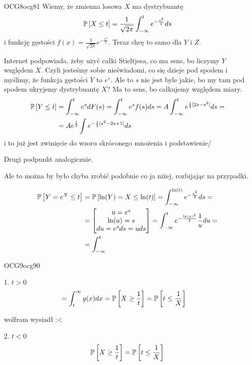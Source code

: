 \documentclass{article}
\begin{document}
\begin{ocg}{OCG8}{ocg8}{1}
Wiemy, że zmienna losowa $X$ ma dystrybuantę
$$\prob{X\leq t}=\frac{1}{\sqrt{2\pi}}\int_{-\infty}^te^{-\frac{s^2}{2}}ds$$
i funkcję gęstości $f(x)=\frac{1}{\sqrt{2\pi}}e^{-\frac{x^2}{2}}$. Teraz chcę to samo dla $Y$ i $Z$.


Internet podpowiada, żeby użyć całki Stieltjesa, co ma sens, bo liczymy $Y$ względem $X$. Czyli jesteśmy sobie nieświadomi, co się dzieje pod spodem i myślimy, że funkcja gęstości $Y$ to $e^s$. Ale to $s$ nie jest byle jakie, bo my tam pod spodem ukryjemy dystrybuantę $X$? Ma to sens, bo całkujemy względem miary.
\begin{align*}
    \prob{Y\leq t}&=\int_{-\infty}^te^sdF(s)=\int_{-\infty}^te^sf(s)ds=A\int_{-\infty}^te^{\frac{1}{2}[2s-s^2]}ds=\\
    &=Ae^\frac{1}{2}\int e^{-\frac{1}{2}[s^2-2s+1]}ds
\end{align*}
i to już jest zwinięcie do wzoru skróconego mnożenia i podstawienie/

Drugi podpunkt analogicznie.

Ale to można by było chyba zrobić podobnie co ja niżej, rozbijając na przypadki.

\begin{align*}
\prob{Y=e^X\leq t}&=\prob{\ln(Y)=X\leq\ln(t)}=\int_{-\infty}^{\ln(t)}e^{-\frac{s^2}{2}}ds=\\
&=\begin{bmatrix}u=e^s\\\ln(u)=s\\du=e^sds=uds\end{bmatrix}=\int_{-\infty}^{t}e^{-\frac{\ln(u)^2}{2}}\frac{1}{u}du=\\
&=\int_{-\infty}^t
\end{align*}

\end{ocg}



\begin{ocg}{OCG9}{ocg9}{0}

1. $t> 0$
\begin{align*}
=\int_t^\infty g(x)dx=\prob{X\geq \frac1t}&=\prob{t\leq \frac1X} 
\end{align*}

wolfram wysiadł :<

2. $t<0$
\begin{align*}
\prob{X\geq\frac1t}=\prob{t\leq\frac1X}
\end{align*}
\end{ocg}
\end{document}
